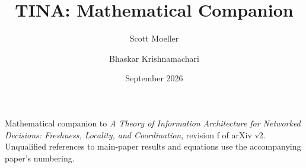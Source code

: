 \documentclass[11pt]{article}
\begin{document}
\title{TINA: Mathematical Companion}
\author{Scott Moeller \and Bhaskar Krishnamachari}
\date{September 2026}
\maketitle
\noindent Mathematical companion to \emph{A Theory of Information Architecture for Networked
Decisions: Freshness, Locality, and Coordination}, revision f of arXiv v2.
Unqualified references to main-paper results and equations use the accompanying paper's numbering.


\end{document}
